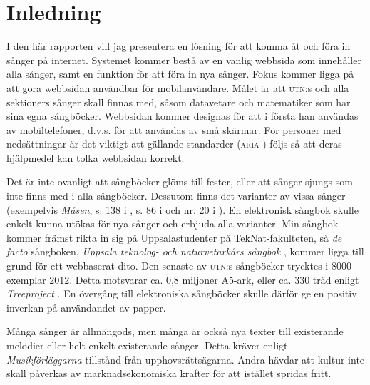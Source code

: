 \section{Inledning}

I den här rapporten vill jag presentera en lösning för att komma åt och föra in sånger på internet. Systemet kommer bestå av en vanlig webbsida som innehåller alla sånger, samt en funktion för att föra in nya sånger. Fokus kommer ligga på att göra webbsidan användbar för mobilanvändare. Målet är att \textsc{utn}:s \cite{utn} och alla sektioners sånger skall finnas med, såsom datavetare \cite{manualen} och matematiker \cite{moebius} som har sina egna sångböcker. Webbsidan kommer designas för att i första han användas av mobiltelefoner, d.v.s. för att användas av små skärmar. För personer med nedsättningar är det viktigt att gällande standarder (\textsc{aria} \cite{aria}) följs så att deras hjälpmedel kan tolka webbsidan korrekt.

Det är inte ovanligt att sångböcker glöms till fester, eller att sånger sjungs som inte finns med i alla sångböcker. Dessutom finns det varianter av vissa sånger (exempelvis \emph{Måsen}, s. 138 i \cite{utn}, s. 86 i \cite{manualen} och nr. 20 i \cite{moebius}). En elektronisk sångbok skulle enkelt kunna utökas för nya sånger och erbjuda alla varianter. Min sångbok kommer främst rikta in sig på Uppsalastudenter på TekNat-fakulteten, så \emph{de facto} sångboken, \emph{Uppsala teknolog- och naturvetarkårs sångbok} \cite{utn}, kommer ligga till grund för ett webbaserat dito. Den senaste av \textsc{utn}:s sångböcker trycktes i 8000 exemplar 2012. Detta motsvarar ca. 0,8 miljoner A5-ark, eller ca. 330 träd enligt \emph{Treeproject} \cite{treeproject}. En övergång till elektroniska sångböcker skulle därför ge en positiv inverkan på användandet av papper.

Många sånger är allmängods, men många är också nya texter till existerande melodier eller helt enkelt existerande sånger. Detta kräver enligt \emph{Musikförläggarna} \cite{musikf} tillstånd från upphovsrättsägarna. Andra hävdar att kultur inte skall påverkas av marknadsekonomiska krafter för att istället spridas fritt. \cite{vp}


